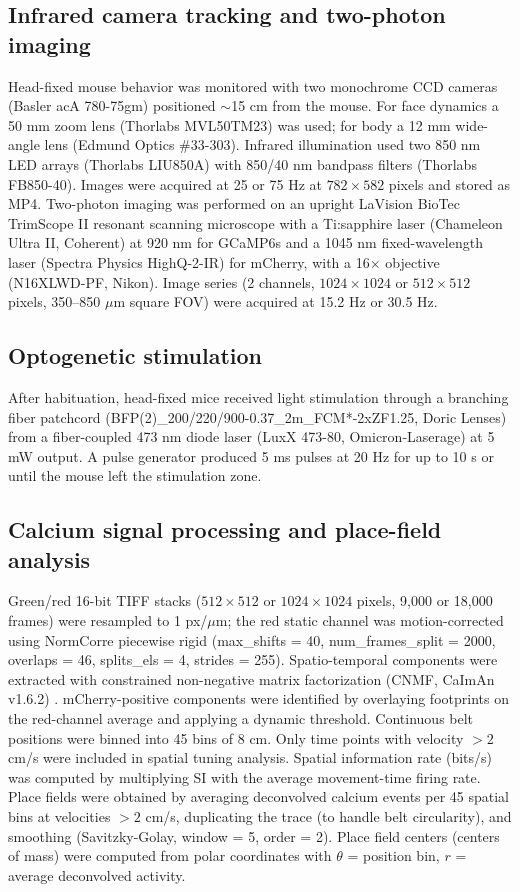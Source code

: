 \documentclass[10pt,a4paper]{article}
\begin{document}
\subsection{Infrared camera tracking and two-photon imaging}
Head-fixed mouse behavior was monitored with two monochrome CCD cameras (Basler acA 780-75gm) positioned $\sim$15 cm from the mouse. For face dynamics a 50 mm zoom lens (Thorlabs MVL50TM23) was used; for body a 12 mm wide-angle lens (Edmund Optics \#33-303). Infrared illumination used two 850 nm LED arrays (Thorlabs LIU850A) with 850/40 nm bandpass filters (Thorlabs FB850-40). Images were acquired at 25 or 75 Hz at $782\times582$ pixels and stored as MP4. Two-photon imaging was performed on an upright LaVision BioTec TrimScope II resonant scanning microscope with a Ti:sapphire laser (Chameleon Ultra II, Coherent) at 920 nm for GCaMP6s and a 1045 nm fixed-wavelength laser (Spectra Physics HighQ-2-IR) for mCherry, with a 16$\times$ objective (N16XLWD-PF, Nikon). Image series (2 channels, $1024\times1024$ or $512\times512$ pixels, 350--850 $\mu$m square FOV) were acquired at 15.2 Hz or 30.5 Hz.

\subsection{Optogenetic stimulation}
After habituation, head-fixed mice received light stimulation through a branching fiber patchcord (BFP(2)\_200/220/900-0.37\_2m\_FCM*-2xZF1.25, Doric Lenses) from a fiber-coupled 473 nm diode laser (LuxX 473-80, Omicron-Laserage) at 5 mW output. A pulse generator produced 5 ms pulses at 20 Hz for up to 10 s or until the mouse left the stimulation zone.

\subsection{Calcium signal processing and place-field analysis}
Green/red 16-bit TIFF stacks ($512\times512$ or $1024\times1024$ pixels, 9{,}000 or 18{,}000 frames) were resampled to 1 px/$\mu$m; the red static channel was motion-corrected using NormCorre piecewise rigid (max\_shifts = 40, num\_frames\_split = 2000, overlaps = 46, splits\_els = 4, strides = 255). Spatio-temporal components were extracted with constrained non-negative matrix factorization (CNMF, CaImAn v1.6.2) \cite{giovannucci2019caiman}. mCherry-positive components were identified by overlaying footprints on the red-channel average and applying a dynamic threshold. Continuous belt positions were binned into 45 bins of 8 cm. Only time points with velocity $>2$ cm/s were included in spatial tuning analysis. Spatial information rate (bits/s) was computed by multiplying SI \cite{skaggs1993information} with the average movement-time firing rate. Place fields were obtained by averaging deconvolved calcium events per 45 spatial bins at velocities $>2$ cm/s, duplicating the trace (to handle belt circularity), and smoothing (Savitzky-Golay, window = 5, order = 2). Place field centers (centers of mass) were computed from polar coordinates with $\theta$ = position bin, $r$ = average deconvolved activity.
\end{document}
